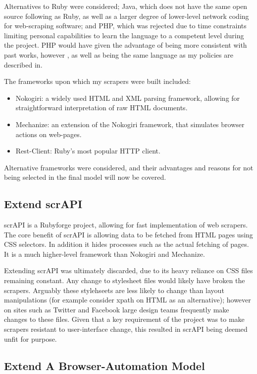 Alternatives to Ruby were considered; Java, which does not have the same open source following as Ruby, as well as a larger degree of lower-level network coding for web-scraping software; and PHP, which was rejected due to time constraints limiting personal capabilities to learn the language to a competent level during the project. PHP would have given the advantage of being more consistent with past works, however \cite{GRAft}, as well as being the same language as my policies are described in. 

The frameworks upon which my scrapers were built included:

\begin{itemize}
 \item Nokogiri: a widely used HTML and XML parsing framework, allowing for straightforward interpretation of raw HTML documents.
 \item Mechanize: an extension of the Nokogiri framework, that simulates browser actions on web-pages.
 \item Rest-Client: Ruby's most popular HTTP client.
\end{itemize}

Alternative frameworks were considered, and their advantages and reasons for not being selected in the final model will now be covered.

\subsection{Extend scrAPI}

scrAPI is a Rubyforge project, allowing for fast implementation of web scrapers. The core benefit of scrAPI is allowing data to be fetched from HTML pages using CSS selectors. In addition it hides processes such as the actual fetching of pages. It is a much higher-level framework than Nokogiri and Mechanize. 

Extending scrAPI was ultimately discarded, due to its heavy reliance on CSS files remaining constant. Any change to stylesheet files would likely have broken the scrapers. Arguably these stylehseets are less likely to change than layout manipulations (for example consider xpath on HTML as an alternative); however on sites such as Twitter and Facebook large design teams frequently make changes to these files. Given that a key requirement of the project was to make scrapers resistant to user-interface change, this resulted in scrAPI being deemed unfit for purpose. 

\subsection{Extend A Browser-Automation Model}

